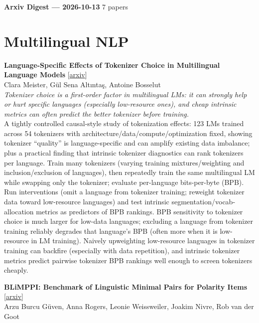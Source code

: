 \documentclass[12pt,letterpaper]{article}
\begin{document}
{\footnotesize\textbf{Arxiv Digest --- 2026-10-13} \hfill 7 papers}

\smallskip

\section*{Multilingual NLP}

{\small\textbf{Language-Specific Effects of Tokenizer Choice in Multilingual Language Models}} {\scriptsize[\href{https://arxiv.org/abs/2610.12144}{arxiv}]}\\
{\scriptsize Clara Meister, Gül Sena Altıntaş, Antoine Bosselut}\\

{\small\textit{Tokenizer choice is a first-order factor in multilingual LMs: it can strongly help or hurt specific languages (especially low-resource ones), and cheap intrinsic metrics can often predict the better tokenizer before training.}}\\[1pt]
{\footnotesize A tightly controlled causal-style study of tokenization effects: 123 LMs trained across 54 tokenizers with architecture/data/compute/optimization fixed, showing tokenizer ``quality'' is language-specific and can amplify existing data imbalance; plus a practical finding that intrinsic tokenizer diagnostics can rank tokenizers per language. Train many tokenizers (varying training mixtures/weighting and inclusion/exclusion of languages), then repeatedly train the same multilingual LM while swapping only the tokenizer; evaluate per-language bits-per-byte (BPB). Run interventions (omit a language from tokenizer training; reweight tokenizer data toward low-resource languages) and test intrinsic segmentation/vocab-allocation metrics as predictors of BPB rankings. BPB sensitivity to tokenizer choice is much larger for low-data languages; excluding a language from tokenizer training reliably degrades that language's BPB (often more when it is low-resource in LM training). Naively upweighting low-resource languages in tokenizer training can backfire (especially with data repetition), and intrinsic tokenizer metrics predict pairwise tokenizer BPB rankings well enough to screen tokenizers cheaply.}

\medskip

{\small\textbf{BLiMPPI: Benchmark of Linguistic Minimal Pairs for Polarity Items}} {\scriptsize[\href{https://arxiv.org/abs/2610.13607}{arxiv}]}\\
{\scriptsize Arzu Burcu Güven, Anna Rogers, Leonie Weissweiler, Joakim Nivre, Rob van der Goot}\\
\end{document}
